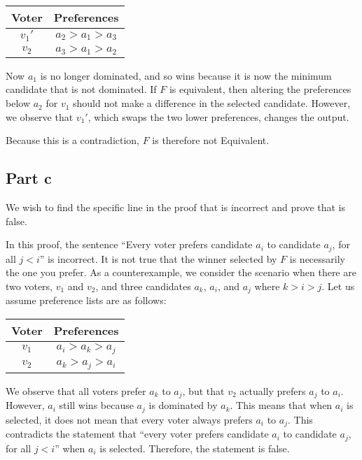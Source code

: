 \documentclass[12pt]{article}%
\begin{document}
\begin{center}
\begin{tabular}{|c|c|}
\hline
Voter & Preferences       \\ \hline
$v_1'$ & $a_2 > a_1 > a_3$ \\ \hline
$v_2$ & $a_3 > a_1 > a_2$ \\ \hline
\end{tabular}
\end{center}

Now $a_1$ is no longer dominated, and so wins because it is now the minimum candidate that is not dominated. If $F$ is equivalent, then altering the preferences below $a_2$ for $v_1$ should not make a difference in the selected candidate. However, we observe that $v_1'$, which swaps the two lower preferences, changes the output.

Because this is a contradiction, $F$ is therefore not Equivalent.

\subsection*{Part c}
We wish to find the specific line in the proof that is incorrect and prove that is false.

In this proof, the sentence “Every voter prefers candidate $a_i$ to candidate $a_j$, for all $j < i$” is incorrect. It is not true that the winner selected by $F$ is necessarily the one you prefer. As a counterexample, we consider the scenario when there are two voters, $v_1$ and $v_2$, and three candidates $a_k$, $a_i$, and $a_j$ where $k > i > j$. Let us assume preference lists are as follows:

\begin{center}
\begin{tabular}{|c|c|}
\hline
Voter & Preferences       \\ \hline
$v_1$ & $a_i > a_k > a_j$ \\ \hline
$v_2$ & $a_k > a_j > a_i$ \\ \hline
\end{tabular}
\end{center}

We observe that all voters prefer $a_k$ to $a_j$, but that $v_2$ actually prefers $a_j$ to $a_i$. However, $a_i$ still wins because $a_j$ is dominated by $a_k$. This means that when $a_i$ is selected, it does not mean that every voter always prefers $a_i$ to $a_j$. This contradicts the statement that “every voter prefers candidate $a_i$ to candidate $a_j$, for all $j < i$” when $a_i$ is selected. Therefore, the statement is false.
\end{document}
